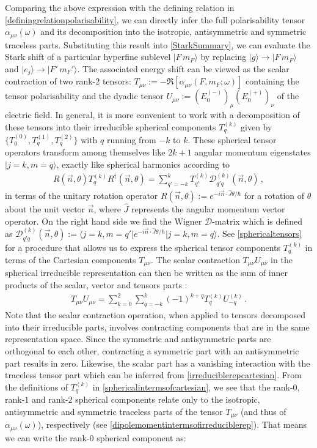 \documentclass[../Thesis-IJspeert.tex]{subfiles}
\begin{document}
Comparing the above expression with the defining relation in \autoref{definingrelationpolarisability}, we can directly infer the full polarisability tensor $\alpha_{\mu\nu}(\omega)$ and its decomposition into the isotropic, antisymmetric and symmetric traceless parts. Substituting this result into \autoref{StarkSummary}, we can evaluate the Stark shift of a particular hyperfine sublevel $\vert F\,m_F \rangle$ by replacing $\vert g \rangle \rightarrow \vert F\,m_F \rangle$ and $\vert e_j \rangle \rightarrow \vert F'\,m_F' \rangle$. The associated energy shift can be viewed as the scalar contraction of two rank-$2$ tensors: $T_{\mu\nu}:=-\Re [ \alpha_{\mu \nu}(F,m_F;\omega) ]$ containing the tensor polarisability and the dyadic tensor $U_{\mu\nu}:=( E_0^{(-)} )_\mu ( E_0^{(+)} )_\nu$ of the electric field. In general, it is more convenient to work with a decomposition of these tensors into their irreducible spherical components $T_q^{(k)}$ given by $\{T_0^{(0)}, T_{q}^{(1)}, T_{q}^{(2)}\}$ with $q$ running from $-k$ to $k$. These spherical tensor operators transform among themselves like $2k+1$ angular momentum eigenstates $\vert j = k, m = q\rangle$, exactly like spherical harmonics according to
\begin{align}
R(\vec{n}, \theta)T_q^{(k)} R^\dagger(\vec{n}, \theta)= \sum_{q'=-k}^{k} T_{q'}^{(k)}\mathcal{D}_{q'q}^{(k)}(\vec{n}, \theta)\,,
\end{align}
in terms of the unitary rotation operator $R(\vec{n}, \theta):=e^{-i\vec{n}\cdot \hat{J}\theta/\hbar}$ for a rotation of $\theta$ about the unit vector $\vec{n}$, where $\hat{J}$ represents the angular momentum vector operator. On the right hand side we find the Wigner $\mathcal{D}$-matrix which is defined as $\mathcal{D}_{q'q}^{(k)}(\vec{n}, \theta):=\langle j=k, m=q' \vert e^{-i\vec{n}\cdot \hat{J}\theta/\hbar} \vert j=k, m=q \rangle$. See \autoref{sphericaltensors} for a procedure that allows us to express the spherical tensor components $T_q^{(k)}$ in terms of the Cartesian components $T_{\mu\nu}$. The scalar contraction $T_{\mu\nu}U_{\mu\nu}$ in the spherical irreducible representation can then be written as the sum of inner products of the scalar, vector and tensors parts \cite{Man2013}:
\begin{align}
\label{scalarcontraction}
	T_{\mu\nu} U_{\mu\nu} = 
	\sum_{k=0}^{2} \sum_{q=-k}^{k} (-1)^{k+q} T^{(k)}_q U^{(k)}_{-q}\,.
\end{align}
Note that the scalar contraction operation, when applied to tensors decomposed into their irreducible parts, involves contracting components that are in the same representation space. Since the symmetric and antisymmetric parts are orthogonal to each other, contracting a symmetric part with an antisymmetric part results in zero. Likewise, the scalar part has a vanishing interaction with the traceless tensor part which can be inferred from \autoref{irreduciblerepcartesian}. From the definitions of $T_q^{(k)}$ in \autoref{sphericalintermsofcartesian}, we see that the rank-$0$, rank-$1$ and rank-$2$ spherical components relate only to the isotropic, antisymmetric and symmetric traceless parts of the tensor $T_{\mu\nu}$ (and thus of $\alpha_{\mu\nu}(\omega)$), respectively (see \autoref{dipolemomentintermsofirreduciblerep}). That means we can write the rank-$0$ spherical component as:
\end{document}
